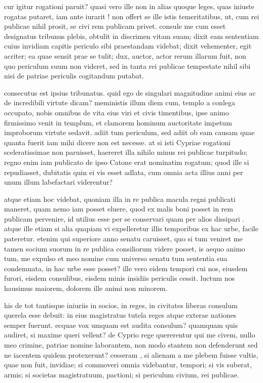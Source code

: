  cur igitur rogationi paruit? quasi vero ille non in alias quoque leges, quas iniuste rogatas putaret, iam ante iurarit ! non offert se ille istis temeritatibus, ut, cum rei publicae nihil prosit, se civi rem publicam privet. consule me cum esset designatus tribunus plebis, obtulit in discrimen vitam suam; dixit eam sententiam cuius invidiam capitis periculo sibi praestandam videbat; dixit vehementer, egit acriter; ea quae sensit prae se tulit; dux, auctor, actor rerum illarum fuit, non quo periculum suum non videret, sed in tanta rei publicae tempestate nihil sibi nisi de patriae periculis cogitandum putabat.

 consecutus est ipsius tribunatus. quid ego de singulari magnitudine animi eius ac de incredibili virtute dicam? meministis illum diem cum, templo a conlega occupato, nobis omnibus de vita eius viri et civis timentibus, ipse animo firmissimo venit in templum, et clamorem hominum auctoritate impetum improborum virtute sedavit. adiit tum periculum, sed adiit ob eam causam quae quanta fuerit iam mihi dicere non est necesse. at si isti Cypriae rogationi sceleratissimae non paruisset, haereret illa nihilo minus rei publicae turpitudo; regno enim iam publicato de ipso Catone erat nominatim rogatum; quod ille si repudiasset, dubitatis quin ei vis esset adlata, cum omnia acta illius anni per unum illum labefactari viderentur?

 atque etiam hoc videbat, quoniam illa in re publica macula regni publicati maneret, quam nemo iam posset eluere, quod ex malis boni posset in rem publicam pervenire, id utilius esse per se conservari quam per alios dissipari . atque ille etiam si alia quapiam vi expelleretur illis temporibus ex hac urbe, facile pateretur. etenim qui superiore anno senatu caruisset, quo si tum veniret me tamen socium suorum in re publica consiliorum videre posset, is aequo animo tum, me expulso et meo nomine cum universo senatu tum sententia sua condemnata, in hac urbe esse posset? ille vero eidem tempori cui nos, eiusdem furori, eisdem consulibus, eisdem minis insidiis periculis cessit. luctum nos hausimus maiorem, dolorem ille animi non minorem.

 his de tot tantisque iniuriis in socios, in reges, in civitates liberas consulum querela esse debuit: in eius magistratus tutela reges atque exterae nationes semper fuerunt. ecquae vox umquam est audita consulum? quamquam quis audiret, si maxime queri vellent? de Cyprio rege quererentur qui me civem, nullo meo crimine, patriae nomine laborantem, non modo stantem non defenderunt sed ne iacentem quidem protexerunt? cesseram , si alienam a me plebem fuisse vultis, quae non fuit, invidiae; si commoveri omnia videbantur, tempori; si vis suberat, armis; si societas magistratuum, pactioni; si periculum civium, rei publicae.

